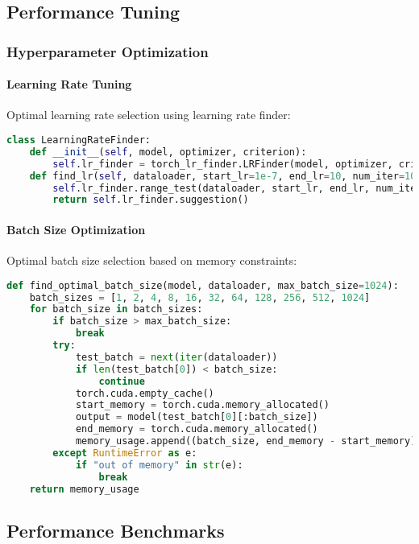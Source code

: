 \subsection{Performance Tuning}

\subsubsection{Hyperparameter Optimization}

\paragraph{Learning Rate Tuning}
Optimal learning rate selection using learning rate finder:

\begin{lstlisting}[language=python, caption=Learning Rate Finder]
class LearningRateFinder:
    def __init__(self, model, optimizer, criterion):
        self.lr_finder = torch_lr_finder.LRFinder(model, optimizer, criterion)
    def find_lr(self, dataloader, start_lr=1e-7, end_lr=10, num_iter=100):
        self.lr_finder.range_test(dataloader, start_lr, end_lr, num_iter)
        return self.lr_finder.suggestion()
\end{lstlisting}

\paragraph{Batch Size Optimization}
Optimal batch size selection based on memory constraints:

\begin{lstlisting}[language=python, caption=Batch Size Optimization]
def find_optimal_batch_size(model, dataloader, max_batch_size=1024):
    batch_sizes = [1, 2, 4, 8, 16, 32, 64, 128, 256, 512, 1024]
    for batch_size in batch_sizes:
        if batch_size > max_batch_size:
            break
        try:
            test_batch = next(iter(dataloader))
            if len(test_batch[0]) < batch_size:
                continue
            torch.cuda.empty_cache()
            start_memory = torch.cuda.memory_allocated()
            output = model(test_batch[0][:batch_size])
            end_memory = torch.cuda.memory_allocated()
            memory_usage.append((batch_size, end_memory - start_memory))
        except RuntimeError as e:
            if "out of memory" in str(e):
                break
    return memory_usage
\end{lstlisting}

\subsection{Performance Benchmarks}

